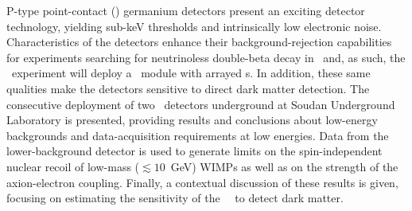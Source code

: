 P-type point-contact (\ppc) germanium detectors present an exciting detector technology,
yielding sub-keV thresholds and intrinsically low electronic noise.  Characteristics of
the detectors enhance their background-rejection capabilities for experiments searching
for neutrinoless double-beta decay in \gersevensix~and, as such, the \MJ~experiment will 
deploy a \minmod~module with arrayed {\ppc}s.  In addition, these same
qualities make the detectors sensitive to direct dark matter detection.  The consecutive 
deployment of two \ppc~detectors underground at Soudan Underground Laboratory is presented, providing
results and conclusions about low-energy backgrounds and data-acquisition requirements at low energies. 
Data from the lower-background detector is used to generate limits on 
the spin-independent nuclear recoil of low-mass ($\lesssim10$~GeV) WIMPs as well as on 
the strength of the axion-electron coupling.  Finally, a contextual discussion
of these results is given, focusing on estimating the sensitivity of the 
\MJ~\minmod~to detect dark matter.
